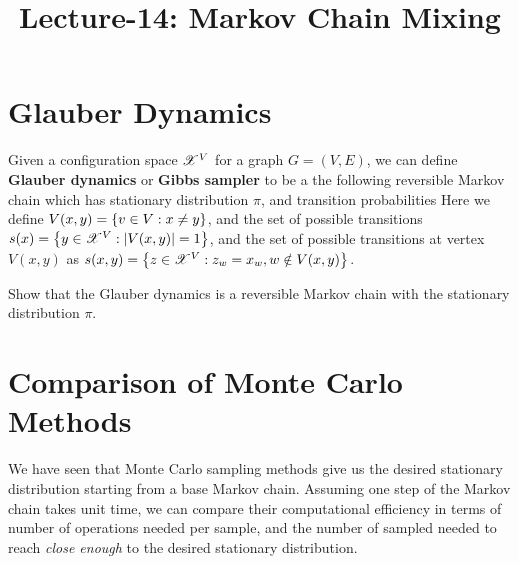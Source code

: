 \documentclass[letterpaper,english,10pt]{article}
\title{Lecture-14: Markov Chain Mixing}
\begin{document}
\maketitle
\section{Glauber Dynamics}
\begin{defn}
Given a configuration space $\mathscr{X}^V$ for a graph $G = (V,E)$, we can define \textbf{Glauber dynamics} or \textbf{Gibbs sampler} to be a the following reversible Markov chain which has stationary distribution $\pi$, 
and transition probabilities 
Here we define $V(x,y) = \left\{v \in V: x \neq y\right\}$, and the set of possible transitions $s(x) = \left\{y \in \mathscr{X}^V: \left\lvert V(x,y)\right\rvert = 1\right\}$, and the set of possible transitions at vertex $V(x,y)$ as  $s(x,y)= \left\{z \in \mathscr{X}^V: z_w = x_w, w \notin V(x,y)\right\}$. 
\end{defn}
\begin{exerc}
Show that the Glauber dynamics is a reversible Markov chain with the stationary distribution $\pi$. 
\end{exerc}
\section{Comparison of Monte Carlo Methods}
We have seen that Monte Carlo sampling methods give us the desired stationary distribution starting from a base Markov chain. 
Assuming one step of the Markov chain takes unit time, 
we can compare their computational efficiency in terms of number of operations needed per sample,  
and the number of sampled needed to reach \textit{close enough} to the desired stationary distribution. 
\end{document}
